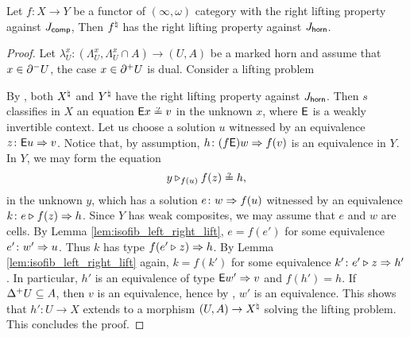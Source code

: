 \begin{lem} \label{lem:isofib_rlp_marked_horn}
    Let \( f \colon X \to Y \) be a functor of \( (\infty, \omega) \) category with the right lifting property against \( J_{\mathsf{comp}} \),
    Then \( {f}^{\natural} \) has the right lifting property against \( J_{\mathsf{horn}} \).
\end{lem}
\begin{proof}
    Let \( \lambda^x_U \colon (\Lambda^x_U, \Lambda^x_U \cap A) \to (U, A) \) be a marked horn and assume that \( x \in \partial_{}^{-} U \), the case \( x \in \partial_{}^{+} U \) is dual.
    Consider a lifting problem
    \begin{center}
    \end{center}
    By \cite[Theorem 4.9]{chanavat2024model}, both \( {X}^{\natural} \) and \( {Y}^{\natural} \) have the right lifting property against \( J_{\mathsf{horn}} \).
    Then \( s \) classifies in \( X \) an equation \( \fun{E}x \qeq v \) in the unknown \( x \), where \( \mathsf{E} \) is a weakly invertible context. 
    Let us choose a solution \( u \) witnessed by an equivalence \( z \colon \mathsf{E}u \Rightarrow v \).
    Notice that, by assumption, \( h \colon (f\mathsf{E})w \Rightarrow f(v) \) is an equivalence in \( Y \).
    In \( Y \), we may form the equation 
    \begin{equation*}
        y \cpsub{f(u)} f(z) \qeq h,
    \end{equation*}
    in the unknown \( y \), which has a solution \( e \colon w \Rightarrow f(u) \) witnessed by an equivalence \( k \colon e \triangleright_{} f(z) \Rightarrow h \).
    Since \( Y \) has weak composites, we may assume that \( e \) and \( w \) are cells.
    By Lemma \ref{lem:isofib_left_right_lift}, \( e = f(e') \) for some equivalence \( e' \colon w' \Rightarrow u \).
    Thus \( k \) has type \( f(e' \triangleright_{} z) \Rightarrow h \).
    By Lemma \ref{lem:isofib_left_right_lift} again, \( k = f(k') \) for some equivalence \( k' \colon e' \triangleright_{} z \Rightarrow h' \).
    In particular, \( h' \) is an equivalence of type \( \mathsf{E}w' \Rightarrow v \) and \( f(h') = h \).
    If \( \Delta_{}^{+} U \subseteq A \), then \( v \) is an equivalence, hence by \cite[Theorem 5.22]{chanavat2024equivalences}, \( w' \) is an equivalence.
    This shows that \( h' \colon U \to X \) extends to a morphism \( (U, A) \to {X}^{\natural} \) solving the lifting problem.
    This concludes the proof.
\end{proof}

